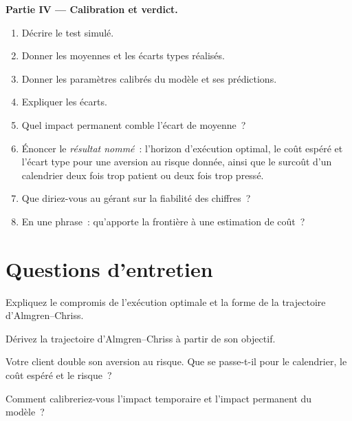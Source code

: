 \begin{problem}
\medskip\noindent\textbf{Partie IV --- Calibration et verdict.}
\begin{enumerate}[resume]
\item Décrire le test simulé.
\item Donner les moyennes et les écarts types réalisés.
\item Donner les paramètres calibrés du modèle et ses prédictions.
\item Expliquer les écarts.
\item Quel impact permanent comble l'écart de moyenne~?
\item Énoncer le \emph{résultat nommé}~: l'horizon d'exécution optimal, le coût espéré et l'écart type pour une aversion au risque donnée, ainsi que le surcoût d'un calendrier
deux fois trop patient ou deux fois trop pressé.
\item Que diriez-vous au gérant sur la fiabilité des chiffres~?
\item En une phrase~: qu'apporte la frontière à une estimation de coût~?
\end{enumerate}
\end{problem}

\section{Questions d'entretien}

\begin{interviewq}\label{iq:mx:the-almgren-chriss-framework:1}
Expliquez le compromis de l'exécution optimale et la forme de la trajectoire d'Almgren--Chriss.
\end{interviewq}

\begin{interviewq}\label{iq:mx:the-almgren-chriss-framework:2}
Dérivez la trajectoire d'Almgren--Chriss à partir de son objectif.
\end{interviewq}

\begin{interviewq}\label{iq:mx:the-almgren-chriss-framework:3}
Votre client double son aversion au risque. Que se passe-t-il pour le calendrier, le coût espéré et le risque~?
\end{interviewq}

\begin{interviewq}\label{iq:mx:the-almgren-chriss-framework:4}
Comment calibreriez-vous l'impact temporaire et l'impact permanent du modèle~?
\end{interviewq}

